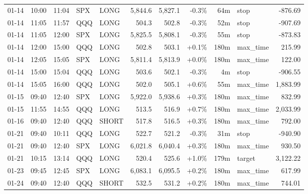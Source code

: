 \documentclass[11pt,a4paper,twoside]{article}
\begin{document}
\begin{center}
\begin{longtable}{>{\color{txtmain}}l l l l l r r r r >{\color{txtmain}}l r}
01-14 & 10:00 & 11:04 & SPX & LONG & 5,844.6 & 5,827.1 & \textcolor{lossred}{-0.3\%} & 64m & stop & \textcolor{lossred}{-876.69} \\
01-14 & 11:05 & 11:57 & QQQ & LONG & 504.3 & 502.8 & \textcolor{lossred}{-0.3\%} & 52m & stop & \textcolor{lossred}{-907.69} \\
01-14 & 11:05 & 12:00 & SPX & LONG & 5,825.5 & 5,808.1 & \textcolor{lossred}{-0.3\%} & 55m & stop & \textcolor{lossred}{-873.83} \\
01-14 & 12:00 & 15:00 & QQQ & LONG & 502.8 & 503.1 & \textcolor{wingreen}{+0.1\%} & 180m & max\_time & \textcolor{wingreen}{215.99} \\
01-14 & 12:05 & 15:05 & SPX & LONG & 5,811.4 & 5,813.9 & \textcolor{wingreen}{+0.0\%} & 180m & max\_time & \textcolor{wingreen}{122.00} \\
01-14 & 15:00 & 15:04 & QQQ & LONG & 503.6 & 502.1 & \textcolor{lossred}{-0.3\%} & 4m & stop & \textcolor{lossred}{-906.55} \\
01-14 & 15:05 & 16:00 & QQQ & LONG & 502.0 & 505.1 & \textcolor{wingreen}{+0.6\%} & 55m & max\_time & \textcolor{wingreen}{1,883.99} \\
01-15 & 09:40 & 12:40 & SPX & LONG & 5,922.0 & 5,938.6 & \textcolor{wingreen}{+0.3\%} & 180m & max\_time & \textcolor{wingreen}{832.99} \\
01-15 & 11:55 & 14:55 & QQQ & LONG & 513.5 & 516.9 & \textcolor{wingreen}{+0.7\%} & 180m & max\_time & \textcolor{wingreen}{2,033.99} \\
01-16 & 09:40 & 12:40 & QQQ & SHORT & 517.8 & 516.5 & \textcolor{wingreen}{+0.3\%} & 180m & max\_time & \textcolor{wingreen}{792.00} \\
01-21 & 09:40 & 10:11 & QQQ & LONG & 522.7 & 521.2 & \textcolor{lossred}{-0.3\%} & 31m & stop & \textcolor{lossred}{-940.90} \\
01-21 & 09:40 & 12:40 & SPX & LONG & 6,021.8 & 6,040.4 & \textcolor{wingreen}{+0.3\%} & 180m & max\_time & \textcolor{wingreen}{930.50} \\
01-21 & 10:15 & 13:14 & QQQ & LONG & 520.4 & 525.6 & \textcolor{wingreen}{+1.0\%} & 179m & target & \textcolor{wingreen}{3,122.22} \\
01-23 & 09:45 & 12:45 & SPX & LONG & 6,083.1 & 6,095.5 & \textcolor{wingreen}{+0.2\%} & 180m & max\_time & \textcolor{wingreen}{617.99} \\
01-24 & 09:40 & 12:40 & QQQ & SHORT & 532.5 & 531.2 & \textcolor{wingreen}{+0.2\%} & 180m & max\_time & \textcolor{wingreen}{744.01} \\

\end{longtable}
\end{center}
\end{document}
